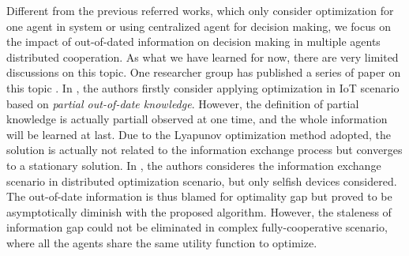 Different from the previous referred works, which only consider optimization for one agent in system or using centralized agent for decision making, we focus on the impact of out-of-dated information on decision making in multiple agents distributed cooperation.
As what we have learned for now, there are very limited discussions on this topic.
One researcher group has published a series of paper on this topic \cite{JSAC17-LyuX,TOC18-LyuX,TWC18-LyuX}.
In \cite{JSAC17-LyuX}, the authors firstly consider applying optimization in IoT scenario based on \emph{partial out-of-date knowledge}.
However, the definition of partial knowledge is actually partiall observed at one time, and the whole information will be learned at last.
Due to the Lyapunov optimization method adopted, the solution is actually not related to the information exchange process but converges to a stationary solution.
In \cite{TWC18-LyuX}, the authors consideres the information exchange scenario in distributed optimization scenario, but only selfish devices considered.
The out-of-date information is thus blamed for optimality gap but proved to be asymptotically diminish with the proposed algorithm.
However, the staleness of information gap could not be eliminated in complex fully-cooperative scenario, where all the agents share the same utility function to optimize.


